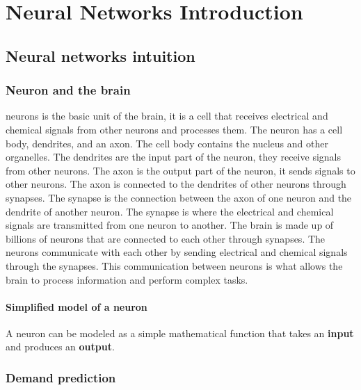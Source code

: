 \chapter{Neural Networks Introduction}
\section{Neural networks intuition}
\subsection*{Neuron and the brain}
neurons is the basic unit of the brain, 
it is a cell that receives electrical and chemical signals from other neurons and processes them.
 The neuron has a cell body, dendrites, and an axon. The cell body contains the nucleus and other organelles.
  The dendrites are the input part of the neuron, they receive signals from other neurons.
 The axon is the output part of the neuron, it sends signals to other neurons.
  The axon is connected to the dendrites of other neurons through synapses. 
  The synapse is the connection between the axon of one neuron and the dendrite of another neuron. 
  The synapse is where the electrical and chemical signals are transmitted from one neuron to another. 
  The brain is made up of billions of neurons that are connected to each other through synapses. 
  The neurons communicate with each other by sending electrical and chemical signals through the synapses. 
  This communication between neurons is what allows the brain to process information and perform complex tasks.

\subsubsection*{Simplified model of a neuron}
A neuron can be modeled as a simple mathematical function that takes an \textbf{input} and produces an \textbf{output}.

\subsection*{Demand prediction}
